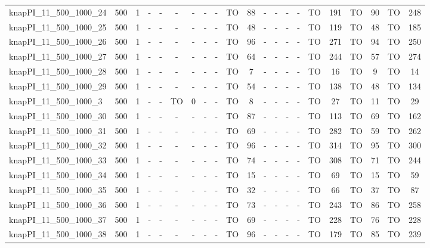 \begin{sidewaystable}[!ht]
{\begin{tabular}{lcccccccccccccccccccc}
knapPI\_11\_500\_1000\_24 & 500 & 1 &  - &  - &  - &  - &  - &  - & TO & 88 &  - &  - &  - &  - & TO & 191 & TO & 90 & TO & 248 \\
knapPI\_11\_500\_1000\_25 & 500 & 1 &  - &  - &  - &  - &  - &  - & TO & 48 &  - &  - &  - &  - & TO & 119 & TO & 48 & TO & 185 \\
knapPI\_11\_500\_1000\_26 & 500 & 1 &  - &  - &  - &  - &  - &  - & TO & 96 &  - &  - &  - &  - & TO & 271 & TO & 94 & TO & 250 \\
knapPI\_11\_500\_1000\_27 & 500 & 1 &  - &  - &  - &  - &  - &  - & TO & 64 &  - &  - &  - &  - & TO & 244 & TO & 57 & TO & 274 \\
knapPI\_11\_500\_1000\_28 & 500 & 1 &  - &  - &  - &  - &  - &  - & TO & 7 &  - &  - &  - &  - & TO & 16 & TO & 9 & TO & 14 \\
knapPI\_11\_500\_1000\_29 & 500 & 1 &  - &  - &  - &  - &  - &  - & TO & 54 &  - &  - &  - &  - & TO & 138 & TO & 48 & TO & 134 \\
knapPI\_11\_500\_1000\_3 & 500 & 1 &  - &  - & TO & 0 &  - &  - & TO & 8 &  - &  - &  - &  - & TO & 27 & TO & 11 & TO & 29 \\
knapPI\_11\_500\_1000\_30 & 500 & 1 &  - &  - &  - &  - &  - &  - & TO & 87 &  - &  - &  - &  - & TO & 113 & TO & 69 & TO & 162 \\
knapPI\_11\_500\_1000\_31 & 500 & 1 &  - &  - &  - &  - &  - &  - & TO & 69 &  - &  - &  - &  - & TO & 282 & TO & 59 & TO & 262 \\
knapPI\_11\_500\_1000\_32 & 500 & 1 &  - &  - &  - &  - &  - &  - & TO & 96 &  - &  - &  - &  - & TO & 314 & TO & 95 & TO & 300 \\
knapPI\_11\_500\_1000\_33 & 500 & 1 &  - &  - &  - &  - &  - &  - & TO & 74 &  - &  - &  - &  - & TO & 308 & TO & 71 & TO & 244 \\
knapPI\_11\_500\_1000\_34 & 500 & 1 &  - &  - &  - &  - &  - &  - & TO & 15 &  - &  - &  - &  - & TO & 69 & TO & 15 & TO & 59 \\
knapPI\_11\_500\_1000\_35 & 500 & 1 &  - &  - &  - &  - &  - &  - & TO & 32 &  - &  - &  - &  - & TO & 66 & TO & 37 & TO & 87 \\
knapPI\_11\_500\_1000\_36 & 500 & 1 &  - &  - &  - &  - &  - &  - & TO & 73 &  - &  - &  - &  - & TO & 243 & TO & 86 & TO & 258 \\
knapPI\_11\_500\_1000\_37 & 500 & 1 &  - &  - &  - &  - &  - &  - & TO & 69 &  - &  - &  - &  - & TO & 228 & TO & 76 & TO & 228 \\
knapPI\_11\_500\_1000\_38 & 500 & 1 &  - &  - &  - &  - &  - &  - & TO & 96 &  - &  - &  - &  - & TO & 179 & TO & 85 & TO & 239 \\

\end{tabular}}
\end{sidewaystable}
